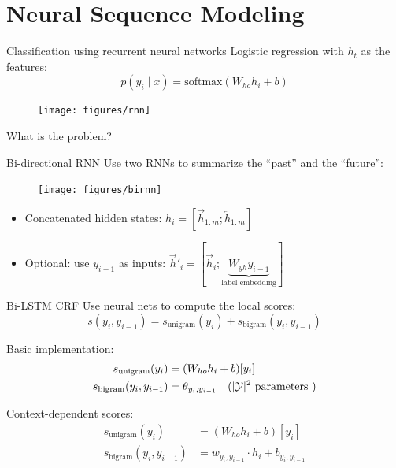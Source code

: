 \documentclass[usenames,dvipsnames,notes]{beamer}
\begin{document}
\section{Neural Sequence Modeling}

\begin{frame}
    {Classification using recurrent neural networks}
    Logistic regression with $h_t$ as the features:
    $$
    p(y_i\mid x) = \text{softmax}(W_{ho}h_i + b)
    $$
    \begin{figure}
        \texttt{[image: figures/rnn]}
    \end{figure}
    What is the problem?
\end{frame}

\begin{frame}
    {Bi-directional RNN}
    Use two RNNs to summarize the ``past'' and the ``future'':
    \begin{figure}
        \texttt{[image: figures/birnn]}
    \end{figure}
    \begin{itemize}
        \item Concatenated hidden states: $h_i=[\overrightarrow{h}_{1:m};                     \overleftarrow{h}_{1:m}]$
        \item Optional: use $y_{i-1}$ as inputs: $\overrightarrow{h}'_i=[\overrightarrow{h}_i; \underbrace{W_{yh}y_{i-1}}_{\text{label embedding}}]$
    \end{itemize}
\end{frame}

\begin{frame}
    {Bi-LSTM CRF}
    Use neural nets to compute the local scores:
    $$
    s(y_i,y_{i-1}) = s_{\text{unigram}}(y_i) + s_{\text{bigram}}(y_i, y_{i-1})
    $$

    Basic implementation:
    \begin{align*}
        s_{\text{unigram}}(y_i) &= (W_{ho}h_i + b)[y_i] \\
        s_{\text{bigram}}(y_i,y_{i-1}) &= \theta_{y_i,y_{i-1}} \quad (|\mathcal{Y}|^2 \text{ parameters })
    \end{align*}

    Context-dependent scores:
    \begin{align*}
        s_{\text{unigram}}(y_i) &= (W_{ho}h_i + b)[y_i] \\
        s_{\text{bigram}}(y_i,y_{i-1}) &= w_{y_i,y_{i-1}} \cdot h_i + b_{y_i,y_{i-1}} 
    \end{align*}
\end{frame}
\end{document}
